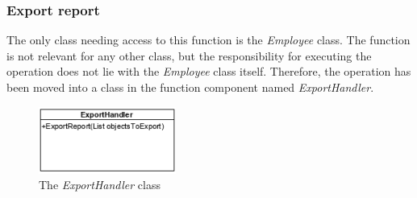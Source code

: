 \subsubsection{Export report}
The only class needing access to this function is the \textit{Employee} class. The function is not relevant for any other class, but the responsibility for executing the operation does not lie with the \textit{Employee} class itself. Therefore, the operation has been moved into a class in the function component named \textit{ExportHandler}.
\begin{figure}[H]
    \centering
    \includegraphics[width=0.4\textwidth]{figures/FunctionComponent/ExportHandler.png}
    \caption{The \textit{ExportHandler} class}
    \label{fig:ExportHandler}
\end{figure}

